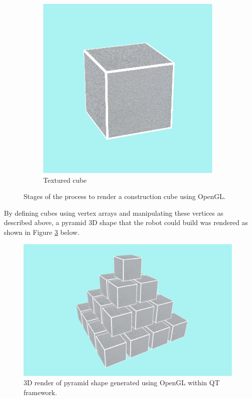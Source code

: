 \begin{figure}[!ht]
	\begin{subfigure}{.32\textwidth}
		\centering
		\includegraphics[width=0.8\linewidth]{figures/cube-render.PNG}
		\caption{Textured cube}
		\label{fig:cube-render}
	\end{subfigure}%
	\caption{Stages of the process to render a construction cube using OpenGL.}
	\label{fig:opengl}
\end{figure}

By defining cubes using vertex arrays and manipulating these vertices as described above, a pyramid 3D shape that the robot could build was rendered as shown in Figure \ref{fig:initial-opengl} below.

\begin{figure}[!ht]
	\centering
	\includegraphics[width=0.8\linewidth]{figures/initial-opengl-shape.PNG}
	\caption{3D render of pyramid shape generated using OpenGL within QT framework.}
	\label{fig:initial-opengl}
\end{figure}


